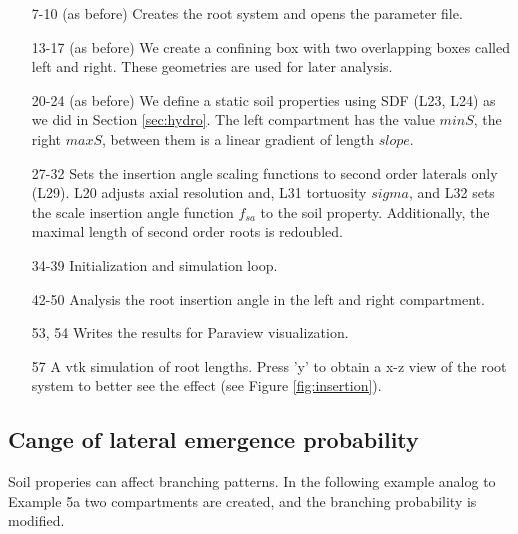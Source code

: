 \begin{itemize}

\item[7-10] (as before) Creates the root system and opens the parameter file.

\item[13-17](as before) We create a confining box with two overlapping boxes called left and right. These geometries are used for later analysis.

\item[20-24] (as before) We define a static soil properties using SDF (L23, L24) as we did in Section \ref{sec:hydro}. 
The left compartment has the value $minS$, the right $maxS$, between them is a linear gradient of length $slope$.

\item[27-32] Sets the insertion angle scaling functions to second order laterals only (L29). L20 adjusts axial resolution and, L31 tortuosity $sigma$, and L32 sets the scale insertion angle function $f_{sa}$ to the soil property. Additionally, the maximal length of second order roots is redoubled. 

\item[34-39] Initialization and simulation loop.

\item[42-50] Analysis the root insertion angle in the left and right compartment. 

\item[53, 54] Writes the results for Paraview visualization.

\item[57] A vtk simulation of root lengths. Press 'y' to obtain a x-z view of the root system to better see the effect (see Figure \ref{fig:insertion}). 

\end{itemize}




\subsection{Cange of lateral emergence probability} \label{sec:branching}

Soil properies can affect branching patterns. In the following example analog to Example 5a two compartments are created, and the branching probability is modified.




